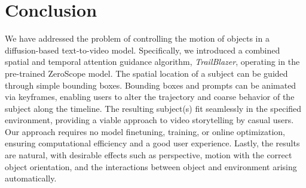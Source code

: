 

\section{Conclusion}
\label{sec:cond}

We have addressed the problem of controlling the motion of objects in a diffusion-based text-to-video model. Specifically, we introduced a combined spatial and temporal attention guidance algorithm, \textit{TrailBlazer}, operating in the pre-trained ZeroScope model. 
The spatial location of a subject can be guided through simple bounding boxes. %
Bounding boxes and prompts can be animated via keyframes, enabling users to alter the trajectory and coarse behavior of the subject along the timeline. The resulting subject(s) fit seamlessly in the specified environment, providing a viable approach to video storytelling by casual users.  Our approach requires no model finetuning, training, or online optimization, ensuring computational efficiency and a good user experience. Lastly, the results are natural, with desirable effects such as perspective, motion with the correct object orientation, and the interactions between object and environment arising automatically.
